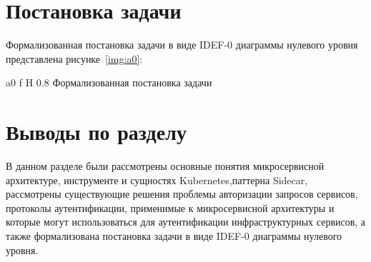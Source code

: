 \section{Постановка задачи}
Формализованная постановка задачи в виде IDEF-0 диаграммы нулевого уровня представлена рисунке~\ref{img:a0}:

    {a0}
    {f}
    {H}
    {0.8\textwidth}
    {Формализованная постановка задачи}


\section*{Выводы по разделу}
В данном разделе были рассмотрены основные понятия микросервисной архитектуре, инструменте и сущностях Kubernetes,паттерна Sidecar, рассмотрены существующие решения проблемы авторизации запросов сервисов, протоколы аутентификации, применимые к микросервисной архитектуры и которые могут использоваться для аутентификации инфраструктурных сервисов, а также формализована постановка задачи в виде IDEF-0 диаграммы нулевого уровня.

